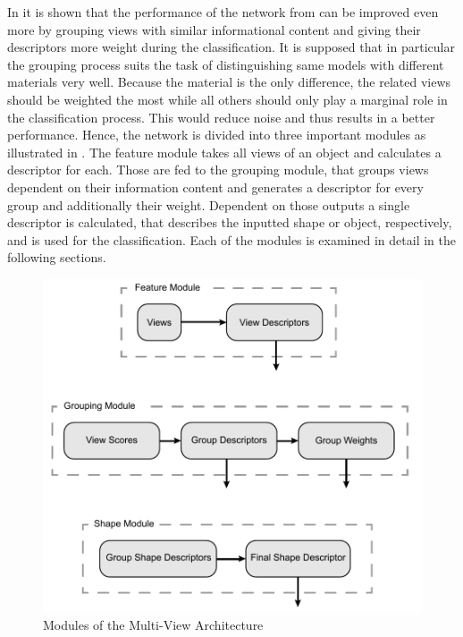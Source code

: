 In \cite{Feng2018} it is shown that the performance of the network from \cite{Su:2015:MCN:2919332.2919750} can be improved even more by grouping views with similar informational content and giving their descriptors more weight during the classification.
It is supposed that in particular the grouping process suits the task of distinguishing same models with different materials very well.
Because the material is the only difference, the related views should be weighted the most while all others should only play a marginal role in the classification process.
This would reduce noise and thus results in a better performance.
Hence, the network is divided into three important modules as illustrated in .
The feature module takes all views of an object and calculates a descriptor for each.
Those are fed to the grouping module, that groups views dependent on their information content and generates a descriptor for every group and additionally their weight.
Dependent on those outputs a single descriptor is calculated, that describes the inputted shape or object, respectively, and is used for the classification.
Each of the modules is examined in detail in the following sections.
\begin{figure}
	\centering
	\includegraphics[]{images/multi_view_architecture.pdf}
	\caption{Modules of the Multi-View Architecture}
	\label{fig:architecture-modules}
\end{figure}



